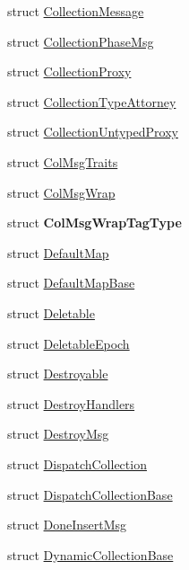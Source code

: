 \begin{DoxyCompactItemize}
\item 
struct \hyperlink{structvt_1_1vrt_1_1collection_1_1_collection_message}{Collection\+Message}
\item 
struct \hyperlink{structvt_1_1vrt_1_1collection_1_1_collection_phase_msg}{Collection\+Phase\+Msg}
\item 
struct \hyperlink{structvt_1_1vrt_1_1collection_1_1_collection_proxy}{Collection\+Proxy}
\item 
struct \hyperlink{structvt_1_1vrt_1_1collection_1_1_collection_type_attorney}{Collection\+Type\+Attorney}
\item 
struct \hyperlink{structvt_1_1vrt_1_1collection_1_1_collection_untyped_proxy}{Collection\+Untyped\+Proxy}
\item 
struct \hyperlink{structvt_1_1vrt_1_1collection_1_1_col_msg_traits}{Col\+Msg\+Traits}
\item 
struct \hyperlink{structvt_1_1vrt_1_1collection_1_1_col_msg_wrap}{Col\+Msg\+Wrap}
\item 
struct {\bfseries Col\+Msg\+Wrap\+Tag\+Type}
\item 
struct \hyperlink{structvt_1_1vrt_1_1collection_1_1_default_map}{Default\+Map}
\item 
struct \hyperlink{structvt_1_1vrt_1_1collection_1_1_default_map_base}{Default\+Map\+Base}
\item 
struct \hyperlink{structvt_1_1vrt_1_1collection_1_1_deletable}{Deletable}
\item 
struct \hyperlink{structvt_1_1vrt_1_1collection_1_1_deletable_epoch}{Deletable\+Epoch}
\item 
struct \hyperlink{structvt_1_1vrt_1_1collection_1_1_destroyable}{Destroyable}
\item 
struct \hyperlink{structvt_1_1vrt_1_1collection_1_1_destroy_handlers}{Destroy\+Handlers}
\item 
struct \hyperlink{structvt_1_1vrt_1_1collection_1_1_destroy_msg}{Destroy\+Msg}
\item 
struct \hyperlink{structvt_1_1vrt_1_1collection_1_1_dispatch_collection}{Dispatch\+Collection}
\item 
struct \hyperlink{structvt_1_1vrt_1_1collection_1_1_dispatch_collection_base}{Dispatch\+Collection\+Base}
\item 
struct \hyperlink{structvt_1_1vrt_1_1collection_1_1_done_insert_msg}{Done\+Insert\+Msg}
\item 
struct \hyperlink{structvt_1_1vrt_1_1collection_1_1_dynamic_collection_base}{Dynamic\+Collection\+Base}
\item 

\end{DoxyCompactItemize}
